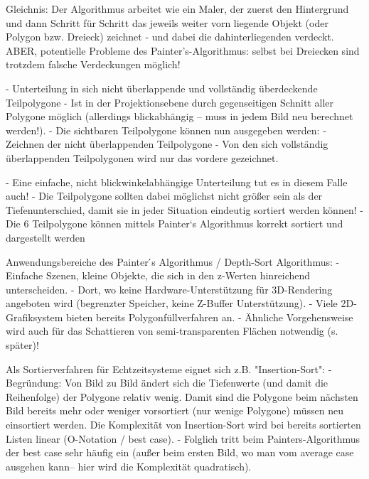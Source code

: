 \documentclass[10pt,landscape]{article}
\begin{document}
\begin{multicols}{3}
Gleichnis: Der Algorithmus arbeitet wie ein Maler, der zuerst den Hintergrund und dann Schritt für Schritt das jeweils weiter vorn liegende Objekt (oder Polygon bzw. Dreieck) zeichnet - und dabei die dahinterliegenden verdeckt. ABER, potentielle Probleme des Painter’s-Algorithmus: selbst bei Dreiecken sind trotzdem falsche Verdeckungen möglich!

- Unterteilung in sich nicht überlappende und vollständig überdeckende Teilpolygone
- Ist in der Projektionsebene durch gegenseitigen Schnitt aller Polygone möglich (allerdings blickabhängig – muss in jedem Bild neu berechnet werden!).
- Die sichtbaren Teilpolygone können nun ausgegeben werden:
  - Zeichnen der nicht überlappenden Teilpolygone
  - Von den sich vollständig überlappenden Teilpolygonen wird nur das vordere gezeichnet.


- Eine einfache, nicht blickwinkelabhängige Unterteilung tut es in diesem Falle auch!
- Die Teilpolygone sollten dabei möglichst nicht größer sein als der Tiefenunterschied, damit sie in jeder Situation eindeutig sortiert werden können!
- Die 6 Teilpolygone können mittels Painter‘s Algorithmus korrekt sortiert und dargestellt werden

Anwendungsbereiche des Painter ́s Algorithmus / Depth-Sort Algorithmus:
- Einfache Szenen, kleine Objekte, die sich in den z-Werten hinreichend unterscheiden.
- Dort, wo keine Hardware-Unterstützung für 3D-Rendering angeboten wird (begrenzter Speicher, keine Z-Buffer Unterstützung).
- Viele 2D-Grafiksystem bieten bereits Polygonfüllverfahren an.
- Ähnliche Vorgehensweise wird auch für das Schattieren von semi-transparenten Flächen notwendig (s. später)!

Als Sortierverfahren für Echtzeitsysteme eignet sich z.B. "Insertion-Sort":
- Begründung: Von Bild zu Bild ändert sich die Tiefenwerte (und damit die Reihenfolge) der Polygone relativ wenig. Damit sind die Polygone beim nächsten Bild bereits mehr oder weniger vorsortiert (nur wenige Polygone) müssen neu einsortiert werden. Die Komplexität von Insertion-Sort wird bei bereits sortierten Listen linear (O-Notation / best case).
- Folglich tritt beim Painters-Algorithmus der best case sehr häufig ein (außer beim ersten Bild, wo man vom average case ausgehen kann– hier wird die Komplexität quadratisch).


\end{multicols}
\end{document}
